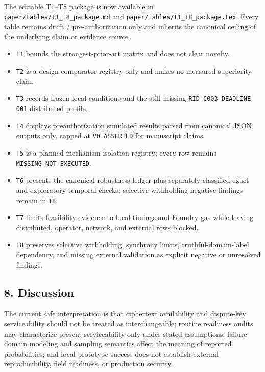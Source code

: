 \documentclass[
]{article}
\providecommand{\tightlist}{%
  \setlength{\itemsep}{0pt}\setlength{\parskip}{0pt}}
\begin{document}
The editable T1--T8 package is now available in
\texttt{paper/tables/t1\_t8\_package.md} and
\texttt{paper/tables/t1\_t8\_package.tex}. Every table remains draft /
pre-authorization only and inherits the canonical ceiling of the
underlying claim or evidence source.

\begin{itemize}
\tightlist
\item
  \texttt{T1} bounds the strongest-prior-art matrix and does not clear
  novelty.
\item
  \texttt{T2} is a design-comparator registry only and makes no
  measured-superiority claim.
\item
  \texttt{T3} records frozen local conditions and the still-missing
  \texttt{RID-C003-DEADLINE-001} distributed profile.
\item
  \texttt{T4} displays preauthorization simulated results parsed from
  canonical JSON outputs only, capped at \texttt{V0\ ASSERTED} for
  manuscript claims.
\item
  \texttt{T5} is a planned mechanism-isolation registry; every row
  remains \texttt{MISSING\_NOT\_EXECUTED}.
\item
  \texttt{T6} presents the canonical robustness ledger plus separately
  classified exact and exploratory temporal checks;
  selective-withholding negative findings remain in \texttt{T8}.
\item
  \texttt{T7} limits feasibility evidence to local timings and Foundry
  gas while leaving distributed, operator, network, and external rows
  blocked.
\item
  \texttt{T8} preserves selective withholding, synchrony limits,
  truthful-domain-label dependency, and missing external validation as
  explicit negative or unresolved findings.
\end{itemize}

\subsection{8. Discussion}\label{discussion}

The current safe interpretation is that ciphertext availability and
dispute-key serviceability should not be treated as interchangeable;
routine readiness audits may characterize present serviceability only
under stated assumptions; failure-domain modeling and sampling semantics
affect the meaning of reported probabilities; and local prototype
success does not establish external reproducibility, field readiness, or
production security.
\end{document}
